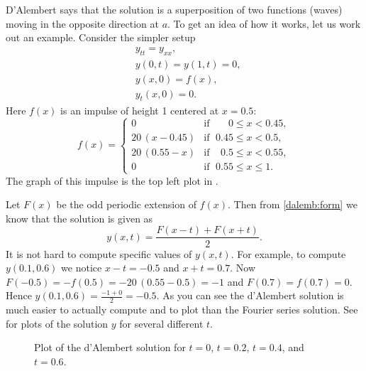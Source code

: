 \begin{example}
D'Alembert says that the solution is a superposition of
two functions (waves) moving in the opposite direction at  $a$.
To get an idea of
how it works, let us work out an example.  Consider the simpler setup
\begin{align*}
& y_{tt} = y_{xx} , \\
& y(0,t) = y(1,t) = 0 , \\
& y(x,0) = f(x) , \\
& y_t(x,0) = 0 .
\end{align*}
Here $f(x)$ is an impulse of height 1 centered at $x=0.5$:
\begin{equation*}
f(x) =
\begin{cases}
0 & \text{if } \; \phantom{0.5}0 \leq x < 0.45, \\
20\,(x-0.45) & \text{if } \; 0.45 \leq x < 0.5, \\
20\,(0.55-x) & \text{if } \; \phantom{5}0.5 \leq x < 0.55, \\
0 & \text{if } \; 0.55 \leq x \leq 1 .
\end{cases}
\end{equation*}
The graph of this impulse is the top left plot in
.

Let $F(x)$ be the odd periodic extension of $f(x)$.  Then from
\eqref{dalemb:form} we know that
the solution is given as
\begin{equation*}
y(x,t) = \frac{F(x-t) + F(x+t)}{2} .
\end{equation*}
It is not hard to compute specific values of $y(x,t)$.  For example, to
compute $y(0.1,0.6)$ we notice $x-t = -0.5$ and $x+t = 0.7$.  Now $F(-0.5) =
-f(0.5) = - 20\,(0.55 - 0.5) = -1$
and $F(0.7) = f(0.7) = 0$.  Hence
$y(0.1,0.6) = \frac{-1 + 0}{2} = -0.5$.  As you can see the d'Alembert
solution is much easier to actually compute and to plot than the Fourier series
solution.  See  for plots of the solution $y$
for several different $t$.
\begin{figure}[h!t]
\capstart
\begin{center}
\noindent
%
\quad%
\par
\smallskip
\par
\noindent
{}%
\quad%
\caption{Plot of the d'Alembert solution for $t=0$, $t=0.2$, $t=0.4$, and
$t=0.6$.%
\label{dalemb:impulsfig}}
\end{center}
\end{figure}
\end{example}

